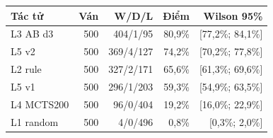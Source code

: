 \begin{center}\small
\begin{tabular}{@{}lrrrr@{}}
\toprule
Tác tử & Ván & W/D/L & Điểm & Wilson 95\% \\
\midrule
L3 AB d3 & 500 & 404/1/95 & 80,9\% & [77,2\%; 84,1\%] \\
L5 v2 & 500 & 369/4/127 & 74,2\% & [70,2\%; 77,8\%] \\
L2 rule & 500 & 327/2/171 & 65,6\% & [61,3\%; 69,6\%] \\
L5 v1 & 500 & 296/1/203 & 59,3\% & [54,9\%; 63,5\%] \\
L4 MCTS200 & 500 & 96/0/404 & 19,2\% & [16,0\%; 22,9\%] \\
L1 random & 500 & 4/0/496 & 0,8\% & [0,3\%; 2,0\%] \\
\bottomrule
\end{tabular}
\end{center}